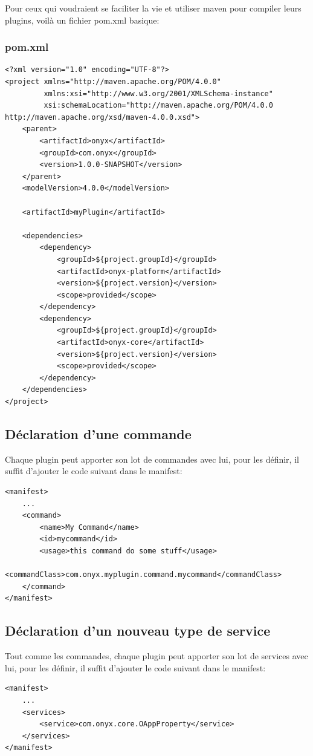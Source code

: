 Pour ceux qui voudraient se faciliter la vie et utiliser maven pour compiler leurs plugins, voilà un fichier pom.xml basique:
\subsubsection{pom.xml}
\begin{verbatim}
<?xml version="1.0" encoding="UTF-8"?>
<project xmlns="http://maven.apache.org/POM/4.0.0"
         xmlns:xsi="http://www.w3.org/2001/XMLSchema-instance"
         xsi:schemaLocation="http://maven.apache.org/POM/4.0.0 http://maven.apache.org/xsd/maven-4.0.0.xsd">
    <parent>
        <artifactId>onyx</artifactId>
        <groupId>com.onyx</groupId>
        <version>1.0.0-SNAPSHOT</version>
    </parent>
    <modelVersion>4.0.0</modelVersion>

    <artifactId>myPlugin</artifactId>

    <dependencies>
        <dependency>
            <groupId>${project.groupId}</groupId>
            <artifactId>onyx-platform</artifactId>
            <version>${project.version}</version>
            <scope>provided</scope>
        </dependency>
        <dependency>
            <groupId>${project.groupId}</groupId>
            <artifactId>onyx-core</artifactId>
            <version>${project.version}</version>
            <scope>provided</scope>
        </dependency>
    </dependencies>
</project>
\end{verbatim}

\subsection{Déclaration d'une commande}

Chaque plugin peut apporter son lot de commandes avec lui, pour les définir, il suffit d'ajouter le code suivant dans le manifest:

\begin{verbatim}
<manifest>
    ...
    <command>
        <name>My Command</name>
        <id>mycommand</id>
        <usage>this command do some stuff</usage>
        <commandClass>com.onyx.myplugin.command.mycommand</commandClass>
    </command>
</manifest>
\end{verbatim}

\subsection{Déclaration d'un nouveau type de service}
Tout comme les commandes, chaque plugin peut apporter son lot de services avec lui, pour les définir, il suffit d'ajouter le code suivant dans le manifest:
\begin{verbatim}
<manifest>
    ...
    <services>
        <service>com.onyx.core.OAppProperty</service>
    </services>
</manifest>
\end{verbatim}

